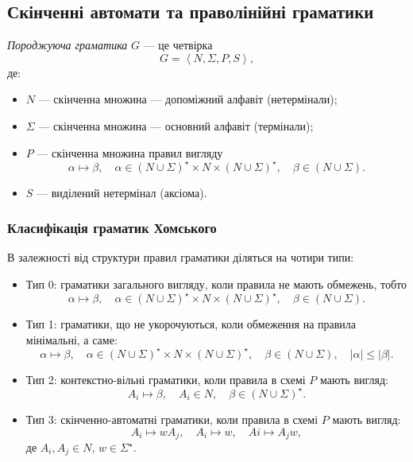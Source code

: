 \subsection{Скінченні автомати та праволінійні граматики}

\textit{Породжуюча граматика} $G$ --- це четвірка
\begin{equation}
	G = \left\langle N, \Sigma, P, S \right\rangle,
\end{equation}
де: 
\begin{itemize}
	\item $N$ --- скінченна множина --- допоміжний алфавіт (нетермінали);
	\item $\Sigma$ --- скінченна множина --- основний алфавіт (термінали);
	\item $P$ --- скінченна множина правил вигляду
	\begin{equation}
		\alpha \mapsto \beta, \quad \alpha \in \left(N \cup \Sigma\right)^\star \times N \times	\left(N \cup \Sigma\right)^\star, \quad \beta \in \left(N \cup \Sigma\right).
	\end{equation}
	\item $S$ --- виділений нетермінал (аксіома).
\end{itemize}

\subsubsection{Класифікація граматик Хомського}

В залежності від структури правил граматики діляться на чотири типи:
\begin{itemize}
	\item Тип 0: граматики загального вигляду, коли правила не мають обмежень, тобто
	\begin{equation}
		\alpha \mapsto \beta, \quad \alpha \in \left(N \cup \Sigma\right)^\star \times N \times	\left(N \cup \Sigma\right)^\star, \quad \beta \in \left(N \cup \Sigma\right).
	\end{equation}
	\item Тип 1: граматики, що не укорочуються, коли обмеження на правила мінімальні, а саме:
	\begin{equation}
		\alpha \mapsto \beta, \quad \alpha \in \left(N \cup \Sigma\right)^\star \times N \times	\left(N \cup \Sigma\right)^\star, \quad \beta \in \left(N \cup \Sigma\right), \quad |\alpha| \le |\beta|.
	\end{equation}
	\item Тип 2: контекстно-вільні граматики, коли правила в схемі $P$ мають вигляд:
	\begin{equation}
		A_i \mapsto \beta, \quad A_i \in N, \quad \beta \in \left(N \cup \Sigma\right)^\star.
	\end{equation}
	\item Тип 3: скінченно-автоматні граматики, коли правила в схемі $P$ мають вигляд:
	\begin{equation}
		A_i \mapsto w A_j, \quad A_i \mapsto w, \quad Ai \mapsto A_j w,
	\end{equation}
	де $A_i, A_j \in N$, $w \in \Sigma^\star$.
\end{itemize}

